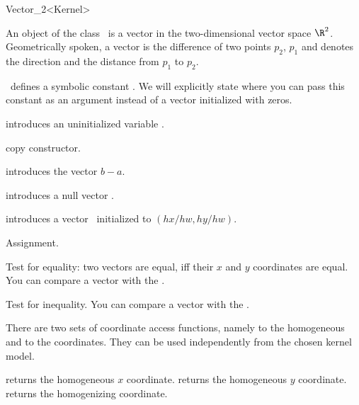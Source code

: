 \begin{ccRefClass} {Vector_2<Kernel>}

\ccDefinition

An object of the class \ccRefName\ is a vector in the two-dimensional 
vector space $\R^2$. Geometrically spoken, a vector is the difference
of two points $p_2$, $p_1$ and denotes the direction and the distance
from   $p_1$ to $p_2$. 

\cgal\ defines a symbolic constant . We 
will explicitly state where you can pass this constant as an argument
instead of a vector initialized with zeros.


\ccCreation
{}


\ccHidden{}
             {introduces an uninitialized variable \ccVar.}

\ccHidden {}
            {copy constructor.}

            {introduces the vector $b-a$.}

            {introduces a null vector \ccVar.}

            {introduces a vector \ccVar\ initialized to $(hx/hw,hy/hw)$.
             \ccPrecond {} }


\ccOperations

\ccHidden {}
        {Assignment.}

       {Test for equality: two vectors are equal, iff their $x$ and $y$ 
        coordinates are equal. You can compare a vector with the
        .}

       {Test for inequality. You can compare a vector with the
        .}

There are two sets of coordinate access functions, namely to the
homogeneous and to the  coordinates. They can be used
independently from the chosen kernel model.

       {returns the homogeneous $x$ coordinate.}
\ccGlue
{}
       {returns the homogeneous $y$ coordinate.}
\ccGlue
{}
       {returns the homogenizing  coordinate.}


\end{ccRefClass}
